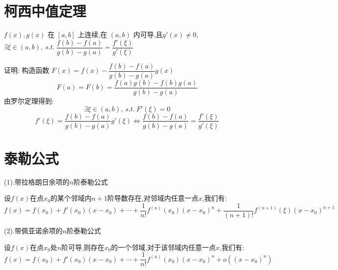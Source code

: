 \section{柯西中值定理}
\begin{theorem}[柯西中值定理]

	$f(x),g(x)$ 在 $[a,b]$ 上连续,在 $(a,b)$ 内可导,且$g'(x)\neq 0$,$\exists \xi\in(a,b),\ s.t.\ \dfrac{f(b)-f(a)}{g(b)-g(a)}=\dfrac{f'(\xi)}{g'(\xi)}$

	证明: 构造函数 $F(x)=f(x)-\dfrac{f(b)-f(a)}{g(b)-g(a)}g(x)$
	$$F(a)=F(b)=\frac{f(a)g(b)-f(b)g(a)}{g(b)-g(a)}$$
	由罗尔定理得到: $$\exists \xi\in(a,b),\ s.t.\ F'(\xi)=0$$
	$$ f'(\xi)=\frac{f(b)-f(a)}{g(b)-g(a)}g'(\xi)\Leftrightarrow  \frac{f(b)-f(a)}{g(b)-g(a)}=\frac{f'(\xi)}{g'(\xi)}$$
\end{theorem}
\section{泰勒公式}
\begin{theorem}[泰勒公式]

	(1).带拉格朗日余项的$n$阶泰勒公式

	设$f(x)$在点$x_{0}$的某个邻域内$n+1$阶导数存在,对邻域内任意一点$x$,我们有:
	$$f(x)=f(x_{0})+f'(x_{0})(x-x_{0})+\cdots+\frac{1}{n!}f^{(n)}(x_{0})(x-x_{0})^{n}+\frac{1}{(n+1)!}f^{(n+1)}(\xi)(x-x_{0})^{n+1}$$

	(2).带佩亚诺余项的$n$阶泰勒公式

	设$f(x)$在点$x_{0}$处$n$阶可导,则存在$x_{0}$的一个邻域,对于该邻域内任意一点$x$,我们有:
	$$f(x)=f(x_{0})+f'(x_{0})(x-x_{0})+\cdots+\frac{1}{n!}f^{(n)}(x_{0})(x-x_{0})^{n}+o((x-x_{0})^n)$$
\end{theorem}
